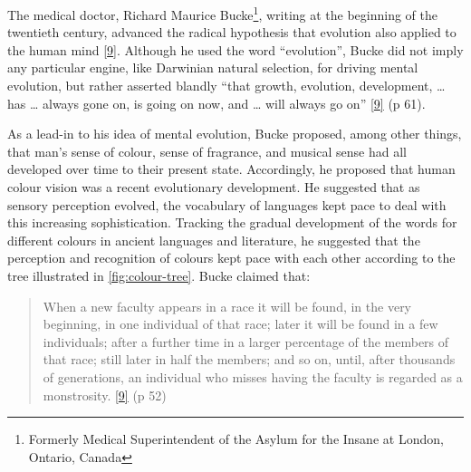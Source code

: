 \documentclass[
  12pt,
  british,
  a4paper,
  rgb,
  dvipsnames,
  svgnames,
  hyphens]{article}
\begin{document}
The medical doctor, Richard Maurice Bucke\footnote{Formerly Medical
  Superintendent of the Asylum for the Insane at London, Ontario, Canada},
writing at the beginning of the twentieth century, advanced the radical
hypothesis that evolution also applied to the human mind
\protect\hyperlink{ref-bucke48}{{[}9{]}}. Although he used the word
``evolution'', Bucke did not imply any particular engine, like Darwinian
natural selection, for driving mental evolution, but rather asserted
blandly ``that growth, evolution, development, \ldots{} has \ldots{}
always gone on, is going on now, and \ldots{} will always go on''
\protect\hyperlink{ref-bucke48}{{[}9{]}} (p 61).

As a lead-in to his idea of mental evolution, Bucke proposed, among
other things, that man's sense of colour, sense of fragrance, and
musical sense had all developed over time to their present state.
Accordingly, he proposed that human colour vision was a recent
evolutionary development. He suggested that as sensory perception
evolved, the vocabulary of languages kept pace to deal with this
increasing sophistication. Tracking the gradual development of the words
for different colours in ancient languages and literature, he suggested
that the perception and recognition of colours kept pace with each other
according to the tree illustrated in \cref{fig:colour-tree}. Bucke
claimed that:

\begin{quote}
When a new faculty appears in a race it will be found, in the very
beginning, in one individual of that race; later it will be found in a
few individuals; after a further time in a larger percentage of the
members of that race; still later in half the members; and so on, until,
after thousands of generations, an individual who misses having the
faculty is regarded as a monstrosity.
\protect\hyperlink{ref-bucke48}{{[}9{]}} (p 52)
\end{quote}
\end{document}
